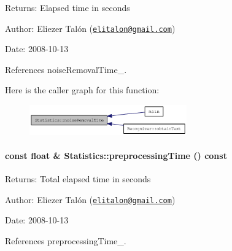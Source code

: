 \begin{Desc}
\item[Returns:]Elapsed time in seconds\end{Desc}
\begin{Desc}
\item[Author:]Eliezer Talón (\href{mailto:elitalon@gmail.com}{\tt elitalon@gmail.com}) \end{Desc}
\begin{Desc}
\item[Date:]2008-10-13 \end{Desc}


References noiseRemovalTime\_\-.

Here is the caller graph for this function:\nopagebreak
\begin{figure}[H]
\begin{center}
\leavevmode
\includegraphics[width=192pt]{class_statistics_2851ad08e1bd9604fe76c78cccc50e84_icgraph}
\end{center}
\end{figure}
\hypertarget{class_statistics_96aafebb86be480130007bd437875156}{
\paragraph[preprocessingTime]{\setlength{\rightskip}{0pt plus 5cm}const float \& Statistics::preprocessingTime () const}\hfill}
\label{class_statistics_96aafebb86be480130007bd437875156}


\begin{Desc}
\item[Returns:]Total elapsed time in seconds\end{Desc}
\begin{Desc}
\item[Author:]Eliezer Talón (\href{mailto:elitalon@gmail.com}{\tt elitalon@gmail.com}) \end{Desc}
\begin{Desc}
\item[Date:]2008-10-13 \end{Desc}


References preprocessingTime\_\-.

